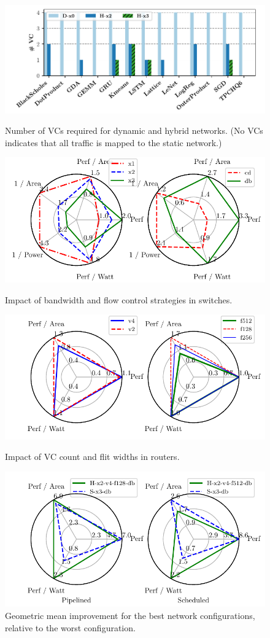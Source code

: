 \begin{figure}
\centering
\includegraphics[width=1\columnwidth]{figs/vc.pdf}
  \caption{Number of VCs required for dynamic and hybrid networks. (No VCs indicates that all traffic is mapped to the static network.)}\label{fig:vc}
\includegraphics[width=1\columnwidth]{figs/radar_switch.pdf}
  \caption{
    Impact of bandwidth and flow control strategies in switches.}\label{fig:radar_switch}
\includegraphics[width=1\columnwidth]{figs/radar_router.pdf}
  \caption{Impact of VC count and flit widths in routers.}\label{fig:radar_router}
\includegraphics[width=1\columnwidth]{figs/radar_best.pdf}
  \caption{Geometric mean improvement for the best network configurations, relative to the worst configuration.}\label{fig:radar_best}
\end{figure}

